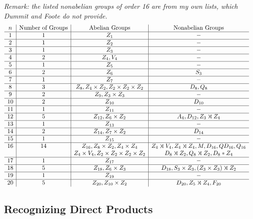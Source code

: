 \textit{Remark: the listed nonabelian groups of order 16 are from my own lists, which Dummit and Foote do not provide.}
\[
\begin{array}{c|c|c|c}
    n & \text{Number of Groups} & \text{Abelian Groups} & \text{Nonabelian Groups} \\
    \hline
    1 & 1 & Z_1 & - \\
    \hline
    2 & 1 & Z_2 & - \\
    \hline
    3 & 1 & Z_3 & - \\
    \hline
    4 & 2 & Z_4, V_4 & - \\
    \hline
    5 & 1 & Z_5 & - \\
    \hline
    6 & 2 & Z_6 & S_3 \\
    \hline
    7 & 1 & Z_7 & - \\
    \hline
    8 & 3 & Z_8, Z_4 \times Z_2, Z_2 \times Z_2 \times Z_2 & D_8, Q_8 \\
    \hline
    9 & 2 & Z_9, Z_3 \times Z_3 & - \\
    \hline
    10 & 2 & Z_{10} & D_{10} \\
    \hline
    11 & 1 & Z_{11} & - \\
    \hline
    12 & 5 & Z_{12}, Z_6 \times Z_2& A_4, D_{12}, Z_3 \semidir Z_4 \\
    \hline
    13 & 1 & Z_{13} & - \\
    \hline
    14 & 2 & Z_{14}, Z_{7} \times Z_{2} & D_{14} \\
    \hline
    15 & 1 & Z_{15} & - \\
    \hline
    16 & 14 & Z_{16}, Z_8 \times Z_2, Z_4 \times Z_4 & Z_4 \semidir V_4, Z_4 \semidir Z_4, M, D_{16}, QD_{16}, Q_{16} \\
    & & Z_4 \times V_4, Z_2 \times Z_2 \times Z_2 \times Z_2 & D_8 \semidir Z_2, Q_8 \semidir Z_2, D_8 * Z_4 \\
    \hline
    17 & 1 & Z_{17} & - \\
    \hline
    18 & 5 & Z_{18}, Z_6 \times Z_3 & D_{18}, S_3 \times Z_3, (Z_3 \times Z_3) \semidir Z_2 \\
    \hline
    19 & 1 & Z_{19} & - \\
    \hline
    20 & 5 & Z_{20}, Z_{10} \times Z_{2} & D_{20}, Z_5 \semidir Z_4, F_{20}
\end{array}\]

\newpage

\subsection{Recognizing Direct Products}

